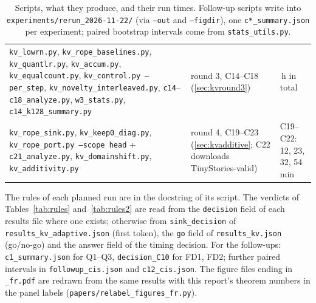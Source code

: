 \documentclass[10pt]{article}
\theoremstyle{plain}
\theoremstyle{definition}
\theoremstyle{remark}
\newcommand{\rl}[1]{\textsf{#1}}%
\begin{document}
\begin{table}[!htb]
\begin{tabularx}{\textwidth}{@{}>{\raggedright}p{4.6cm} >{\raggedright}X >{\raggedright\arraybackslash}p{1.6cm}@{}}
\texttt{kv\_lowrn.py}, \texttt{kv\_rope\_baselines.py}, \texttt{kv\_quantlr.py}, \texttt{kv\_accum.py}, \texttt{kv\_equalcount.py}, \texttt{kv\_control.py --per\_step}, \texttt{kv\_novelty\_interleaved.py}, \texttt{c14}--\texttt{c18\_analyze.py}, \texttt{w3\_stats.py}, \texttt{c14\_k128\_summary.py} & round 3, C14--C18 (\ref{sec:kvround3}) & 7\,h in total\\
\texttt{kv\_rope\_sink.py}, \texttt{kv\_keep0\_diag.py}, \texttt{kv\_rope\_port.py --scope head} + \texttt{c21\_analyze.py}, \texttt{kv\_domainshift.py}, \texttt{kv\_additivity.py} & round 4, C19--C23 (\ref{sec:kvadditive}; C22 downloads TinyStories-valid) & C19--C22: 12, 23, 32, 54\,min\\
\bottomrule
\end{tabularx}
\caption{Scripts, what they produce, and their run times. Follow-up scripts write into \texttt{experiments/rerun\_2026-11-22/} (via \texttt{--out} and \texttt{--figdir}), one \texttt{c*\_summary.json} per experiment; paired bootstrap intervals come from \texttt{stats\_utils.py}.}
\label{tab:scripts}
\end{table}

The rules of each planned run are in the docstring of its script. The verdicts of Tables~\ref{tab:rules} and~\ref{tab:rules2} are read from the \texttt{decision} field of each results file where one exists; otherwise from \texttt{sink\_decision} of \texttt{results\_kv\_adaptive.json} (first token), the \texttt{go} field of \texttt{results\_kv.json} (go/no-go) and the answer field of the timing decision. For the follow-ups: \texttt{c1\_summary.json} for \rl{Q1}--\rl{Q3}, \texttt{decision\_C10} for \rl{FD1}, \rl{FD2}; further paired intervals in \texttt{followup\_cis.json} and \texttt{c12\_cis.json}. The figure files ending in \texttt{\_fr.pdf} are redrawn from the same results with this report's theorem numbers in the panel labels (\texttt{papers/relabel\_figures\_fr.py}).


\end{document}
